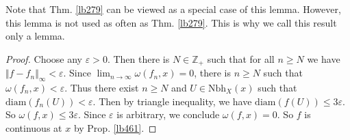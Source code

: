 \documentclass[12pt,b5paper,notitlepage]{article}
\theoremstyle{definition}
\theoremstyle{plain}
\newcommand{\Zbb}{\mathbb Z}
\newcommand{\Nbh}{\mathrm{Nbh}}
\newcommand{\diam}{\mathrm{diam}}
\newcommand{\eps}{\varepsilon}
\numberwithin{equation}{section}
\begin{document}
Note that Thm. \ref{lb279} can be viewed as a special case of this lemma. However, this lemma is not used as often as Thm. \ref{lb279}. This is why we call this result only a lemma.

\begin{proof}
Choose any $\eps>0$. Then there is $N\in\Zbb_+$ such that for all $n\geq N$ we have $\Vert f-f_n\Vert_\infty<\eps$. Since $\lim_{n\rightarrow\infty}\omega(f_n,x)=0$, there is $n\geq N$ such that $\omega(f_n,x)<\eps$. Thus there exist $n\geq N$ and $U\in\Nbh_X(x)$ such that $\diam(f_n(U))<\eps$. Then by triangle inequality, we have $\diam(f(U))\leq 3\eps$. So $\omega(f,x)\leq3\eps$. Since $\eps$ is arbitrary, we conclude $\omega(f,x)=0$. So $f$ is continuous at $x$ by Prop. \ref{lb461}.
\end{proof}
\end{document}

